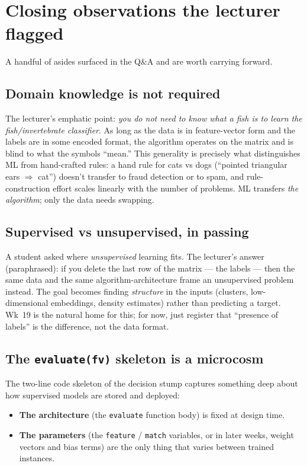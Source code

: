 \documentclass[11pt, a4paper]{article}
\begin{document}
\section{Closing observations the lecturer flagged}

A handful of asides surfaced in the Q\&A and are worth carrying forward.

\subsection{Domain knowledge is not required}

The lecturer's emphatic point: \emph{you do not need to know what a fish is to learn the fish/invertebrate classifier}. As long as the data is in feature-vector form and the labels are in some encoded format, the algorithm operates on the matrix and is blind to what the symbols ``mean.'' This generality is precisely what distinguishes ML from hand-crafted rules: a hand rule for cats vs dogs (``pointed triangular ears $\Rightarrow$ cat'') doesn't transfer to fraud detection or to spam, and rule-construction effort scales linearly with the number of problems. ML transfers \emph{the algorithm}; only the data needs swapping.

\subsection{Supervised vs unsupervised, in passing}

A student asked where \emph{unsupervised} learning fits. The lecturer's answer (paraphrased): if you delete the last row of the matrix — the labels — then the same data and the same algorithm-architecture frame an unsupervised problem instead. The goal becomes finding \emph{structure} in the inputs (clusters, low-dimensional embeddings, density estimates) rather than predicting a target. Wk~19 is the natural home for this; for now, just register that ``presence of labels'' is the difference, not the data format.

\subsection{The \texttt{evaluate(fv)} skeleton is a microcosm}

The two-line code skeleton of the decision stump captures something deep about how supervised models are stored and deployed:

\begin{itemize}
  \item \textbf{The architecture} (the \texttt{evaluate} function body) is fixed at design time.
  \item \textbf{The parameters} (the \texttt{feature} / \texttt{match} variables, or in later weeks, weight vectors and bias terms) are the only thing that varies between trained instances.
\end{itemize}
\end{document}
